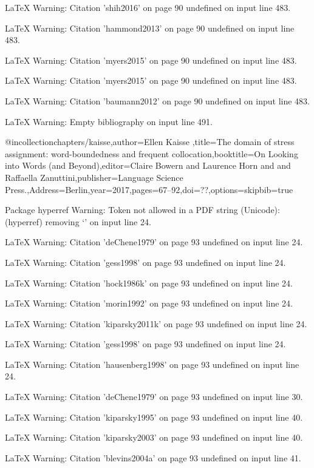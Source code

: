 LaTeX Warning: Citation 'shih2016' on page 90 undefined on input line 483.


LaTeX Warning: Citation 'hammond2013' on page 90 undefined on input line 483.


LaTeX Warning: Citation 'myers2015' on page 90 undefined on input line 483.


LaTeX Warning: Citation 'myers2015' on page 90 undefined on input line 483.


LaTeX Warning: Citation 'baumann2012' on page 90 undefined on input line 483.


LaTeX Warning: Empty bibliography on input line 491.

@incollection{chapters/kaisse,author={Ellen Kaisse },title={{The domain of stress assignment: word-boundedness and frequent collocation}},booktitle={{On Looking into Words (and Beyond)}},editor={Claire Bowern and  Laurence Horn and  and Raffaella Zanuttini},publisher={Language Science Press.},Address={Berlin},year=2017,pages={67--92},doi={??},options={skipbib=true}}

Package hyperref Warning: Token not allowed in a PDF string (Unicode):
(hyperref)                removing `\newline' on input line 24.


LaTeX Warning: Citation 'deChene1979' on page 93 undefined on input line 24.


LaTeX Warning: Citation 'gess1998' on page 93 undefined on input line 24.


LaTeX Warning: Citation 'hock1986k' on page 93 undefined on input line 24.


LaTeX Warning: Citation 'morin1992' on page 93 undefined on input line 24.


LaTeX Warning: Citation 'kiparsky2011k' on page 93 undefined on input line 24.


LaTeX Warning: Citation 'gess1998' on page 93 undefined on input line 24.


LaTeX Warning: Citation 'hausenberg1998' on page 93 undefined on input line 24.


LaTeX Warning: Citation 'deChene1979' on page 93 undefined on input line 30.


LaTeX Warning: Citation 'kiparsky1995' on page 93 undefined on input line 40.


LaTeX Warning: Citation 'kiparsky2003' on page 93 undefined on input line 40.


LaTeX Warning: Citation 'blevins2004a' on page 93 undefined on input line 41.



